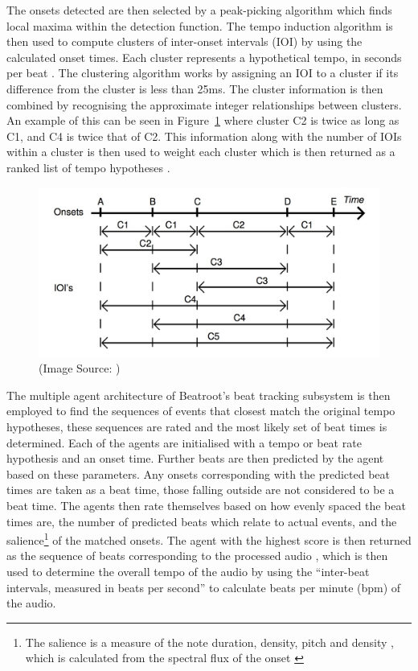 \documentclass[a4paper, 11pt]{article}
\begin{document}
The onsets detected are then selected by a peak-picking algorithm which finds local maxima within the detection function. The tempo induction algorithm is then used to compute clusters of inter-onset intervals (IOI) by using the calculated onset times. Each cluster represents a hypothetical tempo, in seconds per beat \cite{dixon1}. The clustering algorithm works by assigning an IOI to a cluster if its difference from the cluster is less than 25ms. The cluster information is then combined by recognising the approximate integer relationships between clusters. An example of this can be seen in Figure~\ref{fig: br-clusters} where cluster C2 is twice as long as C1, and C4 is twice that of C2. This information along with the number of IOIs within a cluster is then used to weight each cluster which is then returned as a ranked list of tempo hypotheses \cite{dixon4}.

\begin{figure}[ht]
	\centering
	\includegraphics[scale=0.25]{br-clusters}
	\caption{(Image Source: \cite{dixon4})}
	\label{fig: br-clusters}
\end{figure}

The multiple agent architecture of Beatroot's beat tracking subsystem is then employed to find the sequences of events that closest match the original tempo hypotheses, these sequences are rated and the most likely set of beat times is determined. Each of the agents are initialised with a tempo or beat rate hypothesis and an onset time. Further beats are then predicted by the agent based on these parameters. Any onsets corresponding with the predicted beat times are taken as a beat time, those falling outside are not considered to be a beat time. The agents then rate themselves based on how evenly spaced the beat times are, the number of predicted beats which relate to actual events, and the salience\footnote{The salience is a measure of the note duration, density, pitch and density \cite{dixon1}, which is calculated from the spectral flux of the onset \cite{dixon4}} of the matched onsets. The agent with the highest score is then returned as the sequence of beats corresponding to the processed audio \cite{dixon4}, which is then used to determine the overall tempo of the audio by using the ``inter-beat intervals, measured in beats per second'' \cite{dixon1} to calculate beats per minute (bpm) of the audio.
\end{document}
